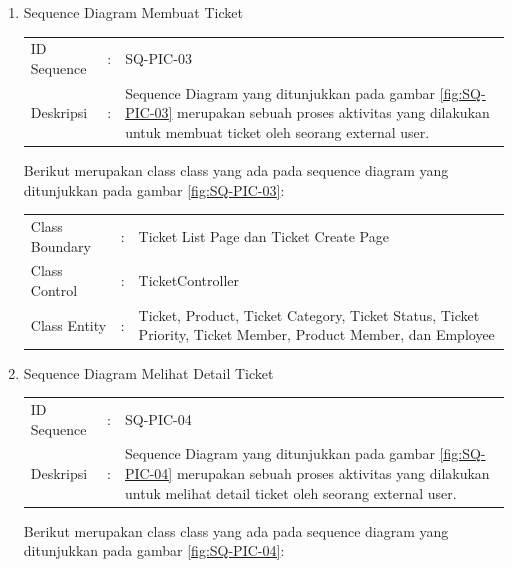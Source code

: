 \documentclass[12pt]{article}
\begin{document}
\begin{enumerate}[label=\textbf{4.\arabic*.}]
\begin{enumerate} [label=\textbf{4.2.\arabic*.}, wide, labelwidth=!, labelindent=0pt]
\begin{enumerate}[label=\textbf{4.2.2.\arabic*.}, wide, labelwidth=!, labelindent=0pt]
\begin{enumerate}[label=\arabic*.]
\begin{tabularx}{.9\linewidth}{@{} l l X @{}}
                \end{tabularx}

                \item Sequence Diagram Membuat Ticket
                
                \begin{tabularx}{.9\linewidth}{@{} l l X @{}}
                    ID Sequence &	: & SQ-PIC-03 \\
                    Deskripsi &	: & Sequence Diagram yang ditunjukkan pada gambar \ref{fig:SQ-PIC-03} merupakan sebuah proses aktivitas yang dilakukan untuk membuat ticket oleh seorang external user. 
        
                \end{tabularx}

                \noindent Berikut merupakan class class yang ada pada sequence diagram yang ditunjukkan pada gambar \ref{fig:SQ-PIC-03}:

                \begin{tabularx}{.9\linewidth}{@{} l l X @{}}
                    Class Boundary & : & Ticket List Page dan Ticket Create Page\\
                    Class Control & : & TicketController \\
                    Class Entity & : & Ticket, Product, Ticket Category, Ticket Status, Ticket Priority, Ticket Member, Product Member, dan Employee
                
                \end{tabularx}
                
                \item Sequence Diagram Melihat Detail Ticket
                
                \begin{tabularx}{.9\linewidth}{@{} l l X @{}}
                    ID Sequence &	: & SQ-PIC-04 \\
                    Deskripsi &	: & Sequence Diagram yang ditunjukkan pada gambar \ref{fig:SQ-PIC-04} merupakan sebuah proses aktivitas yang dilakukan untuk melihat detail ticket oleh seorang external user. 
        
                \end{tabularx}

                \noindent Berikut merupakan class class yang ada pada sequence diagram yang ditunjukkan pada gambar \ref{fig:SQ-PIC-04}:


\end{enumerate}
\end{enumerate}
\end{enumerate}
\end{enumerate}
\end{document}
